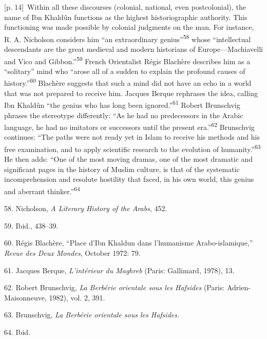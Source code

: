 \documentclass[10pt,a4paper]{article}
\begin{document}
{\scriptsize\color{gray} [p. 14]}\ Within all these discourses (colonial, national, even postcolonial), the name of Ibn Khaldûn functions as the highest historiographic authority. This functioning was made possible by colonial judgments on the man. For instance, R. A. Nicholson considers him “an extraordinary genius”\nobreak\textsuperscript{58} whose “intellectual descendants are the great medieval and modern historians of Europe—Machiavelli and Vico and Gibbon.”\nobreak\textsuperscript{59} French Orientalist Régis Blachère describes him as a “solitary” mind who “arose all of a sudden to explain the profound causes of history.”\nobreak\textsuperscript{60} Blachère suggests that such a mind did not have an echo in a world that was not prepared to receive him. Jacques Berque rephrases the idea, calling Ibn Khaldûn “the genius who has long been ignored.”\nobreak\textsuperscript{61} Robert Brunschvig phrases the stereotype differently: “As he had no predecessors in the Arabic language, he had no imitators or successors until the present era.”\nobreak\textsuperscript{62} Brunschvig continues: “The paths were not ready yet in Islam to receive his methods and his free examination, and to apply scientific research to the evolution of humanity.”\nobreak\textsuperscript{63} He then adds: “One of the most moving dramas, one of the most dramatic and significant pages in the history of Muslim culture, is that of the systematic incomprehension and resolute hostility that faced, in his own world, this genius and aberrant thinker.”\nobreak\textsuperscript{64}\par{\small 58. Nicholson, \textit{A Literary History of the Arabs}, 452.\par}{\small 59. Ibid., 438–39.\par}{\small 60. Régis Blachère, “Place d’Ibn Khaldun dans l’humanisme Arabo-islamique,” \textit{Revue des Deux Mondes}, October 1972: 79.\par}{\small 61. Jacques Berque, \textit{L’intérieur du Maghreb} (Paris: Gallimard, 1978), 13.\par}{\small 62. Robert Brunschvig, \textit{La Berbérie orientale sous les Hafsides} (Paris: Adrien-Maisonneuve, 1982), vol. 2, 391.\par}{\small 63. Brunschvig, \textit{La Berbérie orientale sous les Hafsides.}\par}{\small 64. Ibid.\par}
\end{document}
